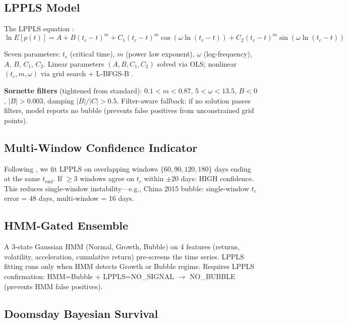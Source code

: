 \documentclass[11pt,a4paper]{article}
\begin{document}
\subsection{LPPLS Model}

The LPPLS equation \citep{sornette2003}:
\begin{equation}
    \ln E[p(t)] = A + B(t_c - t)^m + C_1(t_c - t)^m \cos(\omega \ln(t_c - t)) + C_2(t_c - t)^m \sin(\omega \ln(t_c - t))
\end{equation}

Seven parameters: $t_c$ (critical time), $m$ (power law exponent), $\omega$ (log-frequency), $A$, $B$, $C_1$, $C_2$. Linear parameters $(A, B, C_1, C_2)$ solved via OLS; nonlinear $(t_c, m, \omega)$ via grid search + L-BFGS-B \citep{filimonov2013}.

\textbf{Sornette filters} (tightened from standard): $0.1 < m < 0.87$, $5 < \omega < 13.5$, $B < 0$, $|B| > 0.003$, damping $|B|/|C| > 0.5$. Filter-aware fallback: if no solution passes filters, model reports no bubble (prevents false positives from unconstrained grid points).

\subsection{Multi-Window Confidence Indicator}

Following \citet{sornette2015}, we fit LPPLS on overlapping windows $\{60, 90, 120, 180\}$ days ending at the same $t_{\text{end}}$. If $\geq 3$ windows agree on $t_c$ within $\pm 20$ days: HIGH confidence. This reduces single-window instability---e.g., China 2015 bubble: single-window $t_c$ error = 48 days, multi-window = 16 days.

\subsection{HMM-Gated Ensemble}

A 3-state Gaussian HMM (Normal, Growth, Bubble) on 4 features (returns, volatility, acceleration, cumulative return) pre-screens the time series. LPPLS fitting runs only when HMM detects Growth or Bubble regime. Requires LPPLS confirmation: HMM=Bubble + LPPLS=NO\_SIGNAL $\rightarrow$ NO\_BUBBLE (prevents HMM false positives).

\subsection{Doomsday Bayesian Survival}
\end{document}
